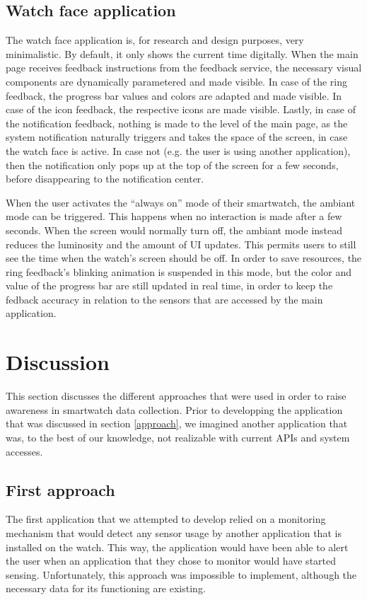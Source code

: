\documentclass[conference, a4paper, 10pt, twocolumn]{IEEEtran}
\begin{document}
\subsection{Watch face application}
The watch face application is, for research and design purposes, very minimalistic. By default, it only shows the current time digitally. When the main page receives feedback instructions from the feedback service, the necessary visual components are dynamically parametered and made visible. In case of the ring feedback, the progress bar values and colors are adapted and made visible. In case of the icon feedback, the respective icons are made visible. Lastly, in case of the notification feedback, nothing is made to the level of the main page, as the system notification naturally triggers and takes the space of the screen, in case the watch face is active. In case not (e.g. the user is using another application), then the notification only pops up at the top of the screen for a few seconds, before disappearing to the notification center. 

When the user activates the ``always on'' mode of their smartwatch, the ambiant mode can be triggered. This happens when no interaction is made after a few seconds. When the screen would normally turn off, the ambiant mode instead reduces the luminosity and the amount of \ac{UI} updates. This permits users to still see the time when the watch's screen should be off. In order to save resources, the ring feedback's blinking animation is suspended in this mode, but the color and value of the progress bar are still updated in real time, in order to keep the fedback accuracy in relation to the sensors that are accessed by the main application.

\section{Discussion}\label{discussion}
This section discusses the different approaches that were used in order to raise awareness in smartwatch data collection. Prior to developping the application that was discussed in section \ref{approach}, we imagined another application that was, to the best of our knowledge, not realizable with current \acp{API} and system accesses.  

\subsection{First approach}
The first application that we attempted to develop relied on a monitoring mechanism that would detect any sensor usage by another application that is installed on the watch. This way, the application would have been able to alert the user when an application that they chose to monitor would have started sensing. Unfortunately, this approach was impossible to implement, although the necessary data for its functioning are existing.
\end{document}
